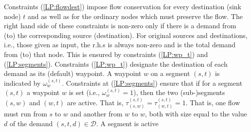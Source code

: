 \documentclass[a4paper,USenglish]{lipics-v2018}
\begin{document}
Constraints (\ref{LP:flowdest}) impose flow conservation for every destination (sink node) $t$
and as well as for the ordinary  nodes which must preserve the flow.
The right hand side of these constraints is non-zero only if there is a demand from (to) the corresponding source (destination). For original sources and destinations, i.e., those given as input, 
the r.h.s is always non-zero and is the total  demand from (to) that node.
This is ensured by constraints (\ref{LP:wp_t}) and  (\ref{LP:segments}).
 Constraints (\ref{LP:wp_t}) designate the destination of each demand as its (default) waypoint.
 A waypoint $w$  on a segment $(s,t)$ is indicated by $\omega^{(s,t)}_{w}$.
Constraints at (\ref{LP:segments}) ensure that if for a segment $(s,t)$
a waypoint $w$ is set (i.e., $\omega^{(s,t)}_{w}=1$),
then the two (sub-)segments $(s,w)$ and $(w,t)$ are active.
That is,
$\tau^{(s,t)}_{(s,w)} = \tau^{(s,t)}_{(w,t)} = 1$.
That is, one flow must run from $s$ to $w$ and another from $w$ to $w$, both with size equal to the value $d$ of the demand $(s,t,d) \in \mathcal{D}$.
A segment is active 
\end{document}
